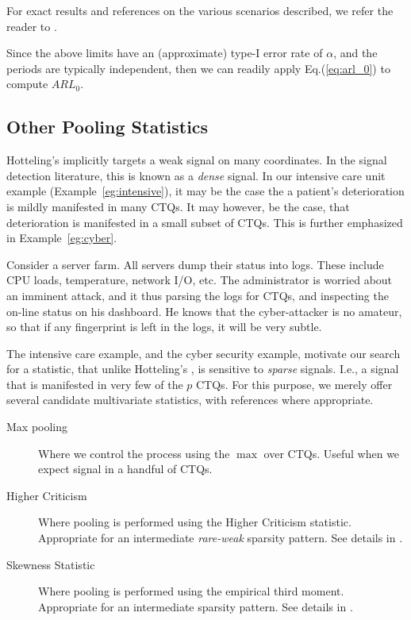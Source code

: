 \begin{extra}
For exact results and references on the various scenarios described, we refer the reader to \cite[Ch.7]{qiu_introduction_2013}.
\end{extra}

Since the above limits have an (approximate) type-I error rate of $\alpha$, and the periods are typically independent, then we can readily apply Eq.(\ref{eq:arl_0}) to compute $ARL_0$.



\subsection{Other Pooling Statistics}
Hotteling's \tsq implicitly targets a weak signal on many coordinates. 
In the signal detection literature, this is known as a \emph{dense} signal.
In our intensive care unit example (Example~\ref{eg:intensive}), it may be the case the a patient's deterioration is mildly manifested in many CTQs. It may however, be the case, that deterioration is manifested in a small subset of CTQs.
This is further emphasized in Example~\ref{eg:cyber}.

\begin{example}
\label{eg:cyber}
Consider a server farm. All servers dump their status into logs. These include CPU loads, temperature, network I/O, etc.
The administrator is worried about an imminent attack, and it thus parsing the logs for CTQs, and inspecting the on-line status on his dashboard.
He knows that the cyber-attacker is no amateur, so that if any fingerprint is left in the logs, it will be very subtle. 
\end{example}

The intensive care example, and the cyber security example, motivate our search for a statistic, that unlike Hotteling's \tsq, is sensitive to \emph{sparse} signals. 
I.e., a signal that is manifested in very few of the $p$ CTQs.
For this purpose, we merely offer several candidate multivariate statistics, with references where appropriate.
\begin{description}
\item [Max pooling] Where we control the process using the $\max$ over CTQs. Useful when we expect signal in a handful of CTQs.
\item [Higher Criticism] Where pooling is performed using the Higher Criticism statistic. Appropriate for an intermediate \emph{rare-weak} sparsity pattern. See details in \citep{jin_cosmological_2005}.
\item [Skewness Statistic] Where pooling is performed using the empirical third moment. Appropriate for an intermediate sparsity pattern. See details in \citep{jin_cosmological_2005}.
\end{description}







